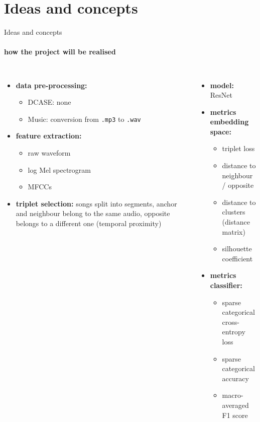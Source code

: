 \documentclass[aspectratio=169, professionalfonts]{beamer}
\begin{document}
\section{Ideas and concepts}

\begin{frame}{Ideas and concepts}
    \framesubtitle{how the project will be realised}
    
    \begin{columns}[T]

        \begin{itemize}
    		\item \textbf{data pre-processing:} \\
    		\begin{itemize}
    		    \item DCASE: none \\
    		    \item Music: conversion from {\small \texttt{.mp3}} to {\small \texttt{.wav}}
    		\end{itemize}
    		\item \textbf{feature extraction:} \\
    		\begin{itemize}
    		    \item raw waveform
    		    \item log Mel spectrogram
    		    \item MFCCs
    		\end{itemize}
    		\item \textbf{triplet selection:} songs split into segments, anchor and neighbour belong to the same audio, opposite belongs to a different one (temporal proximity)
    	\end{itemize}
        
        \begin{itemize}
            \item \textbf{model:} ResNet
    		\item \textbf{metrics embedding space:}\\
    		\begin{itemize}
    		    \item triplet loss
    		    \item distance to neighbour / opposite
    		    \item distance to clusters (distance matrix)
    		    \item silhouette coefficient
    		\end{itemize}
    		\item \textbf{metrics classifier:} \\
    		\begin{itemize}
    		    \item sparse categorical cross-entropy loss
    		    \item sparse categorical accuracy
    		    \item macro-averaged F1 score
    		\end{itemize}
    	\end{itemize}
    \end{columns}
    

\end{frame}
\end{document}
